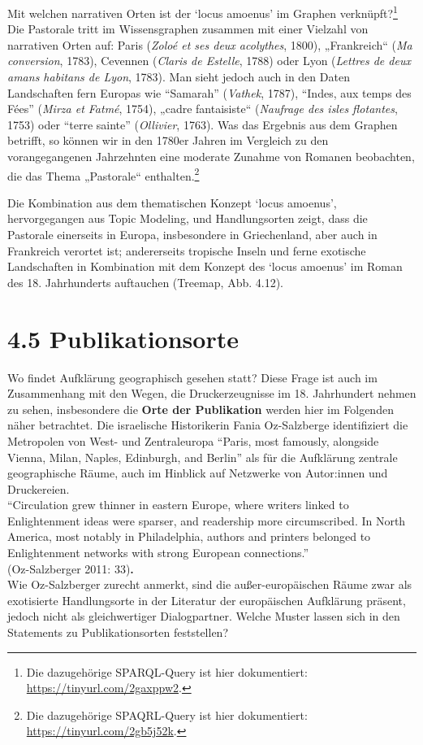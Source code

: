\documentclass[
  12pt,
  letterpaper,
  DIV=11,
  numbers=noendperiod]{scrreprt}
\begin{document}
Mit welchen narrativen Orten ist der `locus amoenus' im Graphen
verknüpft?\footnote{Die dazugehörige SPARQL-Query ist hier dokumentiert:
  \url{https://tinyurl.com/2gaxppw2}.} Die Pastorale tritt im
Wissensgraphen zusammen mit einer Vielzahl von narrativen Orten auf:
Paris (\emph{Zoloé et ses deux acolythes}, 1800), „Frankreich``
(\emph{Ma conversion}, 1783), Cevennen (\emph{Claris de Estelle}, 1788)
oder Lyon (\emph{Lettres de deux amans habitans de Lyon}, 1783). Man
sieht jedoch auch in den Daten Landschaften fern Europas wie ``Samarah''
(\emph{Vathek}, 1787), ``Indes, aux temps des Fées'' (\emph{Mirza et
Fatmé}, 1754), „cadre fantaisiste`` (\emph{Naufrage des isles
flotantes}, 1753) oder ``terre sainte'' (\emph{Ollivier}, 1763). Was das
Ergebnis aus dem Graphen betrifft, so können wir in den 1780er Jahren im
Vergleich zu den vorangegangenen Jahrzehnten eine moderate Zunahme von
Romanen beobachten, die das Thema „Pastorale`` enthalten.\footnote{Die
  dazugehörige SPAQRL-Query ist hier dokumentiert:
  \url{https://tinyurl.com/2gb5j52k}.}

Die Kombination aus dem thematischen Konzept `locus amoenus',
hervorgegangen aus Topic Modeling, und Handlungsorten zeigt, dass die
Pastorale einerseits in Europa, insbesondere in Griechenland, aber auch
in Frankreich verortet ist; andererseits tropische Inseln und ferne
exotische Landschaften in Kombination mit dem Konzept des `locus
amoenus' im Roman des 18. Jahrhunderts auftauchen (Treemap, Abb. 4.12).

\section{4.5 Publikationsorte}\label{publikationsorte}

Wo findet Aufklärung geographisch gesehen statt? Diese Frage ist auch im
Zusammenhang mit den Wegen, die Druckerzeugnisse im 18. Jahrhundert
nehmen zu sehen, insbesondere die \textbf{Orte der Publikation} werden
hier im Folgenden näher betrachtet. Die israelische Historikerin Fania
Oz-Salzberge identifiziert die Metropolen von West- und Zentraleuropa
``Paris, most famously, alongside Vienna, Milan, Naples, Edinburgh, and
Berlin'' als für die Aufklärung zentrale geographische Räume, auch im
Hinblick auf Netzwerke von Autor:innen und Druckereien.\\
``Circulation grew thinner in eastern Europe, where writers linked to
Enlightenment ideas were sparser, and readership more circumscribed. In
North America, most notably in Philadelphia, authors and printers
belonged to Enlightenment networks with strong European connections.''\\
(Oz-Salzberger 2011: 33)\textbf{.}\\
Wie Oz-Salzberger zurecht anmerkt, sind die außer-europäischen Räume
zwar als exotisierte Handlungsorte in der Literatur der europäischen
Aufklärung präsent, jedoch nicht als gleichwertiger Dialogpartner.
Welche Muster lassen sich in den Statements zu Publikationsorten
feststellen?
\end{document}
